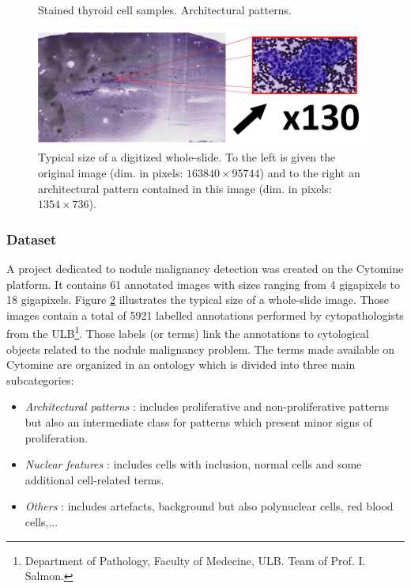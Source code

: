 \begin{figure}
{		\label{sfig:norm_patterns}
	}
	\caption{Stained thyroid cell samples. Architectural patterns.}
	\label{fig:intro_pattern_ex}
\end{figure}

\begin{figure}
	\center
	\includegraphics[scale=0.2]{image/whole-slide-dim.png}
	\caption{Typical size of a digitized whole-slide. To the left is given the original image (dim. in pixels: $163840 \times 95744$) and to the right an architectural pattern contained in this image (dim. in pixels: $1354 \times 736$).}
	\label{fig:prob_dim_illus}
\end{figure}

\subsubsection{Dataset}
\label{sssec:detection_thyroid_dataset}
A project dedicated to nodule malignancy detection was created on the Cytomine platform. It contains 61 annotated images with sizes ranging from 4 gigapixels to 18 gigapixels. Figure \ref{fig:prob_dim_illus} illustrates the typical size of a whole-slide image. Those images contain a total of 5921 labelled annotations performed by cytopathologists from the ULB\footnote{Department of Pathology, Faculty of Medecine, ULB. Team of Prof. I. Salmon.}. Those labels (or terms) link the annotations to cytological objects related to the nodule malignancy problem. The terms made available on Cytomine are organized in an ontology which is divided into three main subcategories:

\begin{itemize}
	\item \textit{Architectural patterns} : includes proliferative and non-proliferative patterns but also an intermediate class for patterns which present minor signs of proliferation.
	\item \textit{Nuclear features} : includes cells with inclusion, normal cells and some additional cell-related terms.
	\item \textit{Others} : includes artefacts, background but also polynuclear cells, red blood cells,...
\end{itemize} 

